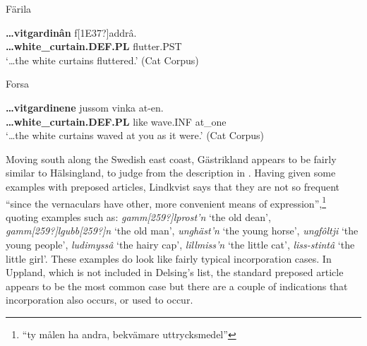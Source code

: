 Färila



 \ea\label{}
\gll \textbf{…vitgardinân} f[1E37?]addrâ.\\


\textbf{…white\_curtain.DEF.PL} flutter.PST\\

\glt ‘…the white curtains fluttered.’ (Cat Corpus)

\z

\item 

Forsa



 \ea\label{}
\gll \textbf{…vitgardinene} jussom  vinka  at-en.\\


\textbf{…white\_curtain.DEF.PL} like  wave.INF  at\_one\\

\glt ‘…the white curtains waved at you as it were.’ (Cat Corpus)

\z

Moving south along the Swedish east coast, Gästrikland appears to be fairly similar to Hälsingland, to judge from the description in \citet[79]{Lindkvist1942}.  Having given some examples with preposed articles, Lindkvist says that they are not so frequent “since the vernaculars have other, more convenient means of expression”,\footnote{ “ty målen ha andra, bekvämare uttrycksmedel”} quoting examples such as: \textit{gamm[259?]lprost’n} ‘the old dean’, \textit{gamm[259?]lgubb[259?]n} ‘the old man’, \textit{unghäst’n} ‘the young horse’, \textit{ungfôltji} ‘the young people’, \textit{ludimyssâ} ‘the hairy cap’, \textit{lillmiss’n} ‘the little cat’, \textit{liss-stintâ} ‘the little girl’. These examples do look like fairly typical incorporation cases.  In Uppland, which is not included in Delsing’s list, the standard preposed article appears to be the most common case but there are a couple of indications that incorporation also occurs, or used to occur.


